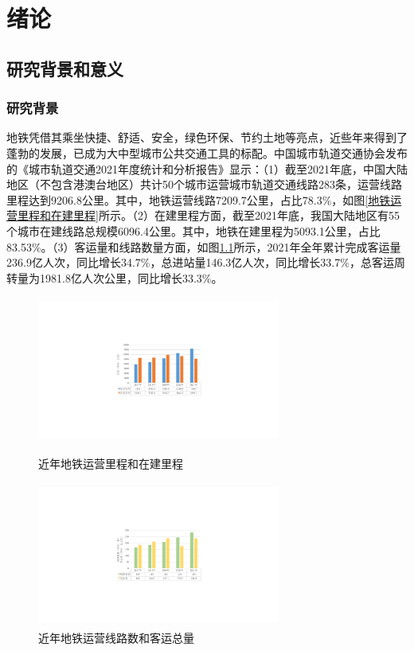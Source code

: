 \chapter{绪论}
%
\section{研究背景和意义}
\subsection{研究背景}
地铁凭借其乘坐快捷、舒适、安全，绿色环保、节约土地等亮点，近些年来得到了蓬勃的发展，已成为大中型城市公共交通工具的标配。中国城市轨道交通协会发布的《城市轨道交通2021年度统计和分析报告》\cite{城市轨道交通2021年度统计和分析报告}显示：（1）截至2021年底，中国大陆地区（不包含港澳台地区）共计50个城市运营城市轨道交通线路283条，运营线路里程达到9206.8公里。其中，地铁运营线路7209.7公里，占比78.3\%，如图\ref{地铁运营里程和在建里程}所示。（2）在建里程方面，截至2021年底，我国大陆地区有55个城市在建线路总规模6096.4公里。其中，地铁在建里程为5093.1公里，占比83.53\%。（3）客运量和线路数量方面，如图\ref{运营线路数和客运总量}所示，2021年全年累计完成客运量236.9亿人次，同比增长34.7\%，总进站量146.3亿人次，同比增长33.7\%，总客运周转量为1981.8亿人次公里，同比增长33.3\%。
\begin{figure}[htbp]
	\centering
	\begin{minipage}[c]{0.5\textwidth} %
		\centering
		\includegraphics[width=8cm,height=4.79cm]{Fig/全国地铁在建里程和运营里程.pdf}
		\caption{\label{地铁运营里程和在建里程}近年地铁运营里程和在建里程}
	\end{minipage}%
	\begin{minipage}[c]{0.5\textwidth}
		\centering
		\includegraphics[width=8cm,height=4.79cm]{Fig/全国地铁运营线路数量和客运总量.pdf}
		\caption{\label{运营线路数和客运总量}近年地铁运营线路数和客运总量}
	\end{minipage}
\end{figure}

